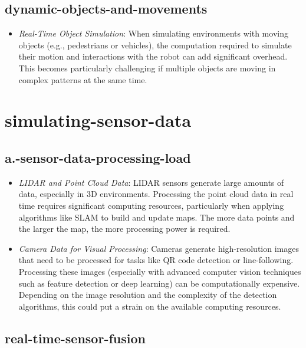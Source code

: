 \documentclass[../../main]{subfiles}
\begin{document}
    \subsection{dynamic-objects-and-movements}    
    \begin{itemize}
    \item
      \emph{Real-Time Object Simulation}: When simulating environments
      with moving objects (e.g., pedestrians or vehicles), the computation
      required to simulate their motion and interactions with the robot can
      add significant overhead. This becomes particularly challenging if
      multiple objects are moving in complex patterns at the same time.
    \end{itemize}
    
    \section{simulating-sensor-data}

    \subsection{a.-sensor-data-processing-load}
    \begin{itemize}
    \item
      \emph{LIDAR and Point Cloud Data}: LIDAR sensors generate large
      amounts of data, especially in 3D environments. Processing the point
      cloud data in real time requires significant computing resources,
      particularly when applying algorithms like SLAM to build and update
      maps. The more data points and the larger the map, the more processing
      power is required.
    \item
      \emph{Camera Data for Visual Processing}: Cameras generate
      high-resolution images that need to be processed for tasks like QR
      code detection or line-following. Processing these images (especially
      with advanced computer vision techniques such as feature detection or
      deep learning) can be computationally expensive. Depending on the
      image resolution and the complexity of the detection algorithms, this
      could put a strain on the available computing resources.
    \end{itemize}
    
    \subsection{real-time-sensor-fusion}
    
\end{document}
